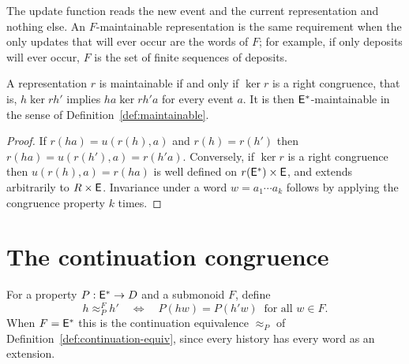 The update function reads the new event and the current representation and nothing else. An $F$-maintainable representation is the same requirement when the only updates that will ever occur are the words of $F$; for example, if only deposits will ever occur, $F$ is the set of finite sequences of deposits.

\begin{established}\label{prop:maintainable}
A representation $r$ is maintainable if and only if $\ker r$ is a right congruence, that is, $h\mathrel{\ker r}h'$ implies $ha\mathrel{\ker r}h'a$ for every event $a$. It is then $\mathsf{E}^{*}$-maintainable in the sense of Definition~\ref{def:maintainable}.
\end{established}
\begin{proof}
If $r(ha)=u(r(h),a)$ and $r(h)=r(h')$ then $r(ha)=u(r(h'),a)=r(h'a)$. Conversely, if $\ker r$ is a right congruence then $u(r(h),a)=r(ha)$ is well defined on $r(\mathsf{E}^{*})\times\mathsf{E}$, and extends arbitrarily to $R\times\mathsf{E}$. Invariance under a word $w=a_1\cdots a_k$ follows by applying the congruence property $k$ times.
\end{proof}

\section{The continuation congruence}

For a property $P:\mathsf{E}^{*}\to D$ and a submonoid $F$, define
\[
h\approx^{F}_{P}h'\quad\Longleftrightarrow\quad P(hw)=P(h'w)\ \text{ for all } w\in F.
\]
When $F=\mathsf{E}^{*}$ this is the continuation equivalence $\approx_P$ of Definition~\ref{def:continuation-equiv}, since every history has every word as an extension.

